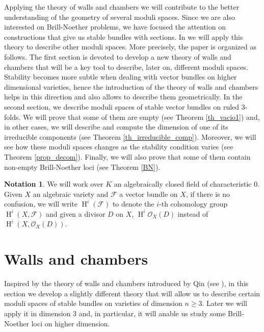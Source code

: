 \documentclass[11pt,twoside]{amsart}
\theoremstyle{definition}
\newtheorem{notation}[theorem]{Notation}
\newcommand{\Ho}{\operatorname{H}}
\begin{document}
Applying the theory of walls and chambers we will contribute to the better understanding of the geometry of several moduli spaces. Since we are also interested on Brill-Noether problems, we have focused the attention on constructions that give us stable bundles with sections. In \cite{trabajo_futuro} we will apply this theory to describe other moduli spaces. More precisely, the paper is organized as follows.  The first section is devoted to develop a new theory of walls and chambers that will be a key tool to describe, later on, different moduli spaces. Stability becomes more subtle when dealing with vector bundles on higher dimensional varieties, hence the introduction of the theory of walls and chambers helps in this direction and also allows to describe them geometrically. In the second section, we describe moduli spaces of stable vector bundles on ruled 3-folds. We will prove that some of them are empty (see Theorem \ref{th_vacio1}) and, in other cases, we will  describe and compute the dimension of one of its irreducible components (see Theorem \ref{th_irreducible_comp}). Moreover, we will see how these moduli spaces changes as the stability condition varies (see Theorem \ref{prop_decom}).  Finally, we will also  prove that some of them contain non-empty Brill-Noether loci (see Theorem \ref{BN}). 

\begin{notation}
    We will work over $K$ an algebraically closed field of characteristic $0$.   
    Given $X$ an algebraic variety and $\mathcal{F}$ a vector bundle on $X$, if there is no confusion, we will write $\Ho^{i}(\mathcal{F})$ to denote the $i$-th cohomology group $\Ho^{i}(X,\mathcal{F})$ and given a divisor $D$ on $X$, $\Ho^{i}\mathcal{O}_X(D)$ instead of $\Ho^{i}(X,\mathcal{O}_X(D))$.
\end{notation}


\section{Walls and chambers}
Inspired by the theory of walls and chambers introduced by Qin (see \cite{Qin1}),  in this section we develop a slightly different theory that will allow us to describe certain moduli spaces of stable bundles on varieties of dimension $n\geq3$. Later we will apply it in dimension $3$ and, in particular, it will %
anable us study some Brill-Noether loci on higher dimension.
\end{document}
